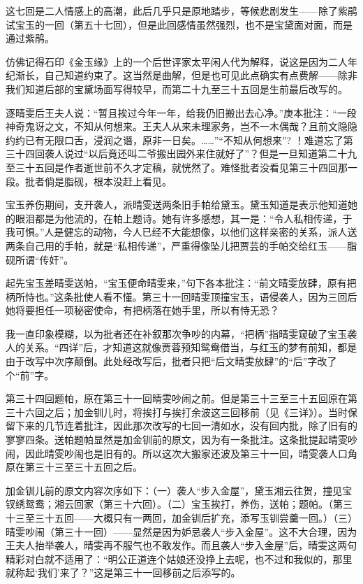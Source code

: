\par 这七回是二人情感上的高潮，此后几乎只是原地踏步，等候悲剧发生——除了紫鹃试宝玉的一回（第五十七回），但是此回感情虽然强烈，也不是宝黛面对面，而是通过紫鹃。
\par 仿佛记得石印《金玉缘》上的一个后世评家太平闲人代为解释，说这是因为二人年纪渐长，自己知道约束了。这当然是曲解，但是也可见此点确实有点费解——除非我们知道后部的宝黛场面写得较早，而第二十九至三十五回是生前最后改写的。
\par 逐晴雯后王夫人说：“暂且挨过今年一年，给我仍旧搬出去心净。”庚本批注：“一段神奇鬼讶之文，不知从何想来。王夫人从来未理家务，岂不一木偶哉？且前文隐隐约约已有无限口舌，浸润之谮，原非一日矣。……”“不知从何想来”? ！难道忘了第三十四回袭人说过“以后竟还叫二爷搬出园外来住就好了”？但是一旦知道第二十九至三十五回是作者逝世前不久才定稿，就恍然了。难怪批者没看见第三十四回那一段。批者倘是脂砚，根本没赶上看见。
\par 宝玉养伤期间，支开袭人，派晴雯送两条旧手帕给黛玉。黛玉知道是表示他知道她的眼泪都是为他流的，在帕上题诗。她有许多感想，其一是：“令人私相传递，于我可惧。”人是健忘的动物，今人已经不大能想像，以他们这样亲密的关系，派人送两条自己用的手帕，就是“私相传递”，严重得像坠儿把贾芸的手帕交给红玉——脂砚所谓“传奸”。
\par 起先宝玉差晴雯送帕，“宝玉便命晴雯来，”句下各本批注：“前文晴雯放肆，原有把柄所恃也。”这条批使人看不懂。第三十一回晴雯顶撞宝玉，语侵袭人，因为三回后她将要担任一项秘密使命，有把柄落在她手里，所以有恃无恐？
\par 我一直印象模糊，以为批者还在补叙那次争吵的内幕，“把柄”指晴雯窥破了宝玉袭人的关系。“四详”后，才知道这就像贾蓉预知鸳鸯借当，与红玉的梦有前知，都是由于改写中次序颠倒。此处经改写后，批者只把“后文晴雯放肆”的“后”字改了个“前”字。
\par 第三十四回题帕，原在第三十一回晴雯吵闹之前。但是第三十三至三十五回原在第三十六回之后；加金钏儿时，将挨打与挨打余波这三回移前（见《三详》）。当时保留下来的几节连着批注，因此那次改写的七回一清如水，没有回内批，除了旧有的寥寥四条。送帕题帕显然是加金钏前的原文，因为有一条批注。这条批提起晴雯吵闹，因此晴雯吵闹也是旧有的。所以这次大搬家还波及第三十一回，晴雯袭人口角原在第三十三至三十五回之后。
\par 加金钏儿前的原文内容次序如下：（一）袭人“步入金屋”，黛玉湘云往贺，撞见宝钗绣鸳鸯；湘云回家（第三十六回）。（二）宝玉挨打，养伤，送帕；题帕。（第三十三至三十五回——大概只有一两回，加金钏后扩充，添写玉钏尝羹一回。）（三）晴雯吵闹（第三十一回）——显然是因为妒忌袭人“步入金屋”。这不大合理，因为王夫人抬举袭人，晴雯再不服气也不敢发作。而且袭人“步入金屋”后，晴雯这两句精彩对白就不适用了：“明公正道连个姑娘还没挣上去呢，也不过和我似的，那里就称起‘我们’来了？”这是第三十一回移前之后添写的。
